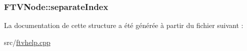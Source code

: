 \subsubsection[{separate\+Index}]{ F\+T\+V\+Node\+::separate\+Index}\label{struct_f_t_v_node_a1f979a212a1251b75ec4a06c1ddeafb4}


La documentation de cette structure a été générée à partir du fichier suivant \+:\begin{DoxyCompactItemize}
\item 
src/\hyperlink{ftvhelp_8cpp}{ftvhelp.\+cpp}\end{DoxyCompactItemize}
